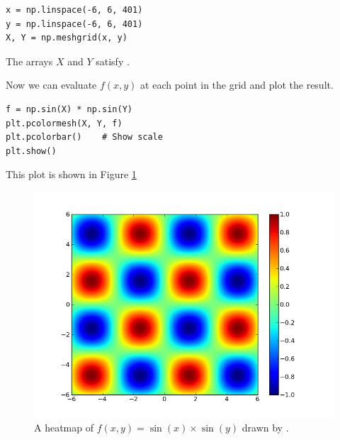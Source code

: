 \begin{lstlisting}
x = np.linspace(-6, 6, 401)
y = np.linspace(-6, 6, 401)
X, Y = np.meshgrid(x, y)
\end{lstlisting}
The arrays $X$ and $Y$ satisfy .

Now we can evaluate $f(x,y)$ at each point in the grid and plot the result.
\begin{lstlisting}
f = np.sin(X) * np.sin(Y)
plt.pcolormesh(X, Y, f)
plt.pcolorbar()    # Show scale
plt.show()
\end{lstlisting}
This plot is shown in Figure \ref{fig:pcmexample}
\begin{figure}
\includegraphics[width=\textwidth]{sinxsiny.png}
\caption{A heatmap of $f(x,y)=\sin\left(x\right)\times\sin\left(y\right)$ drawn by .}
\label{fig:pcmexample}
\end{figure}

